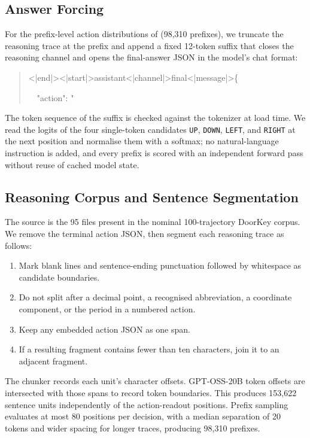 \documentclass{article}
\begin{document}
\subsection{Answer Forcing}
\label{app:answer-forcing}
For the prefix-level action distributions of  (98,310 prefixes), we truncate the reasoning trace at the prefix and append a fixed 12-token suffix that closes the reasoning channel and opens the final-answer JSON in the model's chat format:
\begin{quote}
\ttfamily
<|end|><|start|>assistant<|channel|>final<|message|>\{\par
\ \ "action": "
\end{quote}
The token sequence of the suffix is checked against the tokenizer at load time.
We read the logits of the four single-token candidates \texttt{UP}, \texttt{DOWN}, \texttt{LEFT}, and \texttt{RIGHT} at the next position and normalise them with a softmax; no natural-language instruction is added, and every prefix is scored with an independent forward pass without reuse of cached model state.

\subsection{Reasoning Corpus and Sentence Segmentation}\label{app:reasoning-measurement}
The source is the 95 files present in the nominal 100-trajectory DoorKey corpus. We remove the terminal action JSON, then segment each reasoning trace as follows:
\begin{enumerate}
\item Mark blank lines and sentence-ending punctuation followed by whitespace as candidate boundaries.
\item Do not split after a decimal point, a recognised abbreviation, a coordinate component, or the period in a numbered action.
\item Keep any embedded action JSON as one span.
\item If a resulting fragment contains fewer than ten characters, join it to an adjacent fragment.
\end{enumerate}
The chunker records each unit's character offsets. GPT-OSS-20B token offsets are intersected with those spans to record token boundaries. This produces 153,622 sentence units independently of the action-readout positions. Prefix sampling evaluates at most 80 positions per decision, with a median separation of 20 tokens and wider spacing for longer traces, producing 98,310 prefixes.
\end{document}
